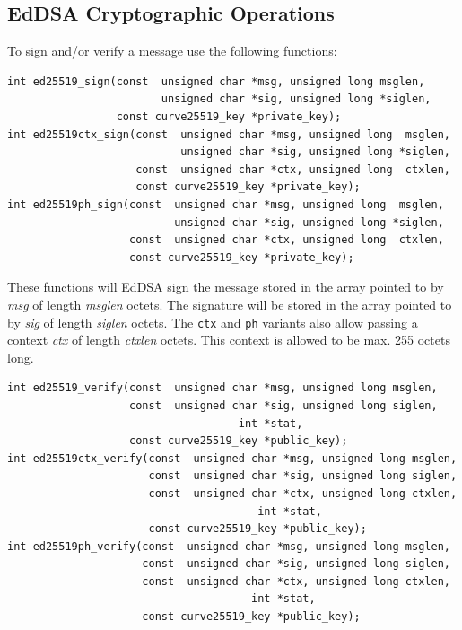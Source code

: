 \documentclass[synpaper]{book}
\begin{document}
\subsection{EdDSA Cryptographic Operations}

To sign and/or verify a message use the following functions:

\begin{verbatim}
int ed25519_sign(const  unsigned char *msg, unsigned long msglen,
                        unsigned char *sig, unsigned long *siglen,
                 const curve25519_key *private_key);
int ed25519ctx_sign(const  unsigned char *msg, unsigned long  msglen,
                           unsigned char *sig, unsigned long *siglen,
                    const  unsigned char *ctx, unsigned long  ctxlen,
                    const curve25519_key *private_key);
int ed25519ph_sign(const  unsigned char *msg, unsigned long  msglen,
                          unsigned char *sig, unsigned long *siglen,
                   const  unsigned char *ctx, unsigned long  ctxlen,
                   const curve25519_key *private_key);
\end{verbatim}

These functions will EdDSA sign the message stored in the array pointed to by \textit{msg} of length \textit{msglen} octets.  The signature
will be stored in the array pointed to by \textit{sig} of length \textit{siglen} octets.  The \texttt{ctx} and \texttt{ph} variants also
allow passing a context \textit{ctx} of length \textit{ctxlen} octets.  This context is allowed to be max. 255 octets long.

\begin{verbatim}
int ed25519_verify(const  unsigned char *msg, unsigned long msglen,
                   const  unsigned char *sig, unsigned long siglen,
                                    int *stat,
                   const curve25519_key *public_key);
int ed25519ctx_verify(const  unsigned char *msg, unsigned long msglen,
                      const  unsigned char *sig, unsigned long siglen,
                      const  unsigned char *ctx, unsigned long ctxlen,
                                       int *stat,
                      const curve25519_key *public_key);
int ed25519ph_verify(const  unsigned char *msg, unsigned long msglen,
                     const  unsigned char *sig, unsigned long siglen,
                     const  unsigned char *ctx, unsigned long ctxlen,
                                      int *stat,
                     const curve25519_key *public_key);
\end{verbatim}
\end{document}
